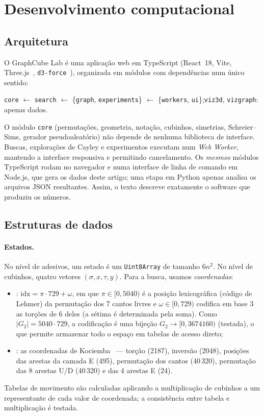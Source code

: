 \section{Desenvolvimento computacional}\label{sec:desenvolvimento}

\subsection{Arquitetura}
O GraphCube Lab é uma aplicação web em TypeScript (React~18, Vite, Three.js~\cite{threejs}, \texttt{d3-force}~\cite{bostock2011}), organizada em módulos com dependências num único sentido:
\begin{center}
\texttt{core} $\leftarrow$ \texttt{search} $\leftarrow$ \{\texttt{graph}, \texttt{experiments}\} $\leftarrow$ \{\texttt{workers}, \texttt{ui}\};\qquad \texttt{viz3d}, \texttt{vizgraph}: apenas dados.
\end{center}
O módulo \texttt{core} (permutações, geometria, notação, cubinhos, simetrias, Schreier--Sims, gerador pseudoaleatório) não depende de nenhuma biblioteca de interface. Buscas, explorações de Cayley e experimentos executam num \textit{Web Worker}, mantendo a interface responsiva e permitindo cancelamento. Os \emph{mesmos} módulos TypeScript rodam no navegador e numa interface de linha de comando em Node.js, que gera os dados deste artigo; uma etapa em Python apenas analisa os arquivos JSON resultantes. Assim, o texto descreve exatamente o software que produziu os números.

\subsection{Estruturas de dados}
\paragraph{Estados.} No nível de adesivos, um estado é um \texttt{Uint8Array} de tamanho $6n^2$. No nível de cubinhos, quatro vetores $(\sigma,x,\tau,y)$. Para a busca, usamos \emph{coordenadas}:
\begin{itemize}[nosep]
\item {}: $\mathrm{idx}=\pi\cdot729+\omega$, em que $\pi\in[0,5040)$ é a posição lexicográfica (código de Lehmer) da permutação dos 7 cantos livres e $\omega\in[0,729)$ codifica em base 3 as torções de 6 deles (a sétima é determinada pela soma). Como $|G_2|=5040\cdot729$, a codificação é uma bijeção $G_2\to[0,\num{3674160})$ (testada), o que permite armazenar todo o espaço em tabelas de acesso direto;
\item {}: as coordenadas de Kociemba~\cite{kociembaweb} --- torção (2187), inversão (2048), posições das arestas da camada E (495), permutação dos cantos (40\,320), permutação das 8 arestas U/D (40\,320) e das 4 arestas E (24).
\end{itemize}
Tabelas de movimento são calculadas aplicando a multiplicação de cubinhos a um representante de cada valor de coordenada; a consistência entre tabela e multiplicação é testada.

